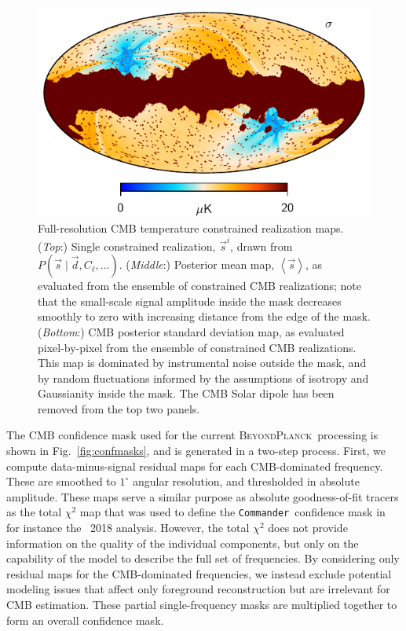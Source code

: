 \documentclass[twocolumn]{aa}
\def\commander{\texttt{Commander}}
\renewcommand{\d}[0]{\vec{d}}
\newcommand{\s}[0]{\vec{s}}
\newcommand{\BP}{\textsc{BeyondPlanck}}
\begin{document}
\begin{figure}[t]
  \includegraphics[width=\linewidth]{figs/cmb_BP10_highl_rms.pdf}
  \caption{Full-resolution CMB temperature constrained realization
    maps. (\emph{Top}:) Single constrained realization, $\s^i$, drawn
    from $P(\s\mid \d, C_{\ell}, \ldots)$. (\emph{Middle}:) Posterior mean
    map, $\left<\s\right>$, as evaluated from the ensemble of
    constrained CMB realizations; note that the small-scale signal
    amplitude inside the mask decreases smoothly to zero with
    increasing distance from the edge of the mask. (\emph{Bottom}:) CMB posterior
    standard deviation map, as evaluated pixel-by-pixel from the
    ensemble of constrained CMB realizations. This map is dominated by
    instrumental noise outside the mask, and by random fluctuations
    informed by the assumptions of isotropy and Gaussianity inside the
    mask. The CMB Solar dipole has been removed from the top two panels.}\label{fig:cmbmaps_highl}
\end{figure}

The CMB confidence mask used for the current \BP\ processing is shown
in Fig.~\ref{fig:confmasks}, and is generated in a two-step
process. First, we compute data-minus-signal residual maps for each
CMB-dominated frequency. These are smoothed to $1^{\circ}$ angular
resolution, and thresholded in absolute amplitude. These maps serve a
similar purpose as absolute goodness-of-fit tracers as the total
$\chi^2$ map that was used to define the \commander\ confidence mask
in for instance the \Planck\ 2018 analysis. However, the total $\chi^2$ does not provide information on the quality of the individual components, but only on the capability of the model to describe the full set of frequencies. By considering only residual maps for the CMB-dominated frequencies, we instead exclude potential modeling issues that affect only foreground reconstruction but are irrelevant for CMB estimation. These partial single-frequency masks
are multiplied together to form an overall confidence mask. 
\end{document}
